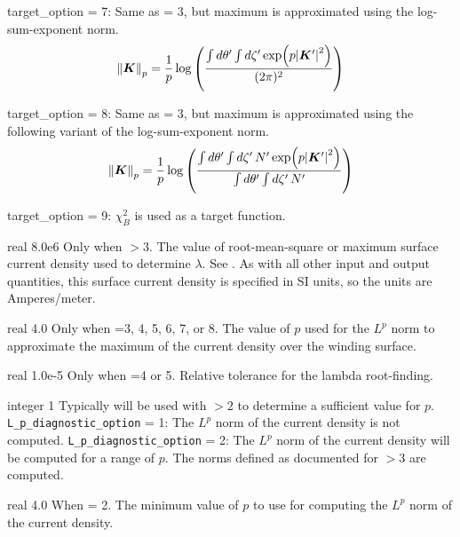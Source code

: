 {{\ttfamily target\_option} = 7: Same as  = 3, but maximum is approximated using the log-sum-exponent norm. 
\begin{gather}
\norm{\bm{K}}_p = \frac{1}{p} \log\left( \frac{\int d \theta' \int d \zeta'  \exp (p \abs{\bm{K}'}^2 ) }{ (2 \pi)^2}\right)
\end{gather}

{\ttfamily target\_option} = 8: Same as  = 3, but maximum is approximated using the following variant of the log-sum-exponent norm.
\begin{gather}
\norm{\bm{K}}_p = \frac{1}{p} \log \left( \frac{\int d \theta' \int d \zeta' \, N' \exp (p \abs{\bm{K}'}^2 ) }{ \int d \theta' \int d \zeta' \, N' }\right)
\end{gather}

{\ttfamily target\_option} = 9: $\chi^2_B$ is used as a target function.

}


\myhrule

{real}
{8.0e6}
{Only when $>3$.}
{The value of root-mean-square or maximum surface current density used to determine $\lambda$.
See .
As with all other input and output quantities, this surface current density is specified in SI units,
so the units are Amperes/meter.
}

\myhrule

{real}
{4.0}
{Only when =3, 4, 5, 6, 7, or 8.}
{The value of $p$ used for the $L^p$ norm to approximate the maximum of the current density over the
winding surface.}

\myhrule

{real}
{1.0e-5}
{Only when =4 or 5.}
{Relative tolerance for the lambda root-finding.}

\myhrule

{integer}
{1}
{Typically will be used with  $> 2$ to determine a sufficient value for $p$.}
{
\texttt{L\_p\_diagnostic\_option} = 1: The $L^p$ norm of the current density is not computed. 
\texttt{L\_p\_diagnostic\_option} = 2: The $L^p$ norm of the current density will be computed
for a range of $p$. The norms defined as documented for  $> 3$ are computed. 
}

\myhrule

{real}
{4.0}
{When  = 2.}
{
The minimum value of $p$ to use for computing the $L^p$ norm of the current density.
}

